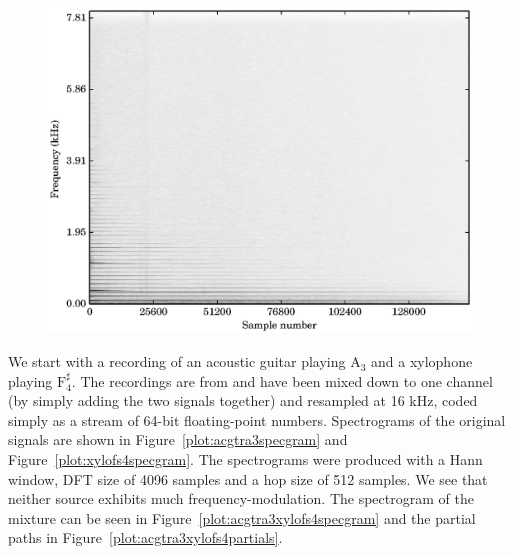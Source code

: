 \begin{figure}[t]%
    \centering
    \includegraphics[width=\figwidthscale\textwidth]{plots/partial_estimation_acgtr_xylo_specgram.eps}
\end{figure}

We start with a recording of an acoustic guitar playing $\text{A}_{3}$ and
a xylophone playing $\text{F}_{4}^{\sharp}$.  The recordings are from
\cite{opolko1987mcgill} and have been mixed down to one channel (by simply
adding the two signals together) and resampled at 16 kHz, coded simply as a
stream of 64-bit floating-point numbers. Spectrograms of the original signals
are shown in Figure~\ref{plot:acgtra3specgram} and
Figure~\ref{plot:xylofs4specgram}. The spectrograms were produced with a Hann
window, DFT size of 4096 samples and a hop size of 512 samples. We see that
neither source exhibits much frequency-modulation. The spectrogram of
the mixture can be seen in Figure~\ref{plot:acgtra3xylofs4specgram} and the
partial paths in Figure~\ref{plot:acgtra3xylofs4partials}.

